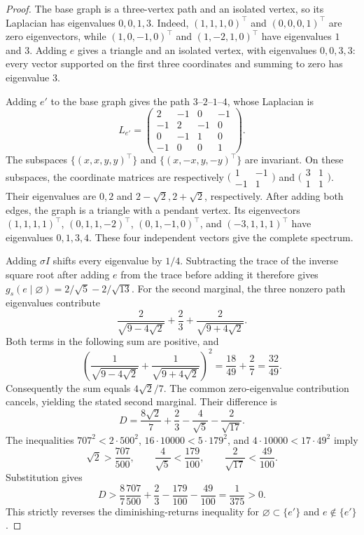 \documentclass[conference]{IEEEtran}
\theoremstyle{definition}
\begin{document}
\begin{proof}
The base graph is a three-vertex path and an isolated vertex, so its Laplacian has eigenvalues $0,0,1,3$.
Indeed, $(1,1,1,0)^\top$ and $(0,0,0,1)^\top$ are zero eigenvectors, while $(1,0,-1,0)^\top$ and $(1,-2,1,0)^\top$ have eigenvalues $1$ and $3$.
Adding $e$ gives a triangle and an isolated vertex, with eigenvalues $0,0,3,3$: every vector supported on the first three coordinates and summing to zero has eigenvalue $3$.

Adding ${e'}$ to the base graph gives the path $3$--$2$--$1$--$4$, whose Laplacian is
\[
L_{e'}=\begin{pmatrix}
2&-1&0&-1\\-1&2&-1&0\\0&-1&1&0\\-1&0&0&1
\end{pmatrix}.
\]
The subspaces $\{(x,x,y,y)^\top\}$ and $\{(x,-x,y,-y)^\top\}$ are invariant.
On these subspaces, the coordinate matrices are respectively
$\bigl(\begin{smallmatrix}1&-1\\-1&1\end{smallmatrix}\bigr)$ and
$\bigl(\begin{smallmatrix}3&1\\1&1\end{smallmatrix}\bigr)$.
Their eigenvalues are $0,2$ and $2-\sqrt2,2+\sqrt2$, respectively.
After adding both edges, the graph is a triangle with a pendant vertex.
Its eigenvectors $(1,1,1,1)^\top$, $(0,1,1,-2)^\top$,
$(0,1,-1,0)^\top$, and $(-3,1,1,1)^\top$ have eigenvalues $0,1,3,4$.
These four independent vectors give the complete spectrum.

Adding $\sigma I$ shifts every eigenvalue by $1/4$.
Subtracting the trace of the inverse square root after adding $e$ from the trace before adding it therefore gives
$g_s(e\mid\varnothing)=2/\sqrt5-2/\sqrt{13}$.
For the second marginal, the three nonzero path eigenvalues contribute
\[
\frac2{\sqrt{9-4\sqrt2}}+\frac23+
\frac2{\sqrt{9+4\sqrt2}}.
\]
Both terms in the following sum are positive, and
\[
\left(\frac1{\sqrt{9-4\sqrt2}}+
\frac1{\sqrt{9+4\sqrt2}}\right)^2
=\frac{18}{49}+\frac27=\frac{32}{49}.
\]
Consequently the sum equals $4\sqrt2/7$.
The common zero-eigenvalue contribution cancels, yielding the stated second marginal.
Their difference is
\[
D=\frac{8\sqrt2}{7}+\frac23-\frac4{\sqrt5}-\frac2{\sqrt{17}}.
\]
The inequalities $707^2<2\cdot500^2$, $16\cdot10000<5\cdot179^2$,
and $4\cdot10000<17\cdot49^2$ imply
\[
\sqrt2>\frac{707}{500},\qquad
\frac4{\sqrt5}<\frac{179}{100},\qquad
\frac2{\sqrt{17}}<\frac{49}{100}.
\]
Substitution gives
\[
D>\frac87\frac{707}{500}+\frac23
-\frac{179}{100}-\frac{49}{100}=\frac1{375}>0.
\]
This strictly reverses the diminishing-returns inequality for
$\varnothing\subset\{{e'}\}$ and $e\notin\{{e'}\}$.
\end{proof}
\end{document}
